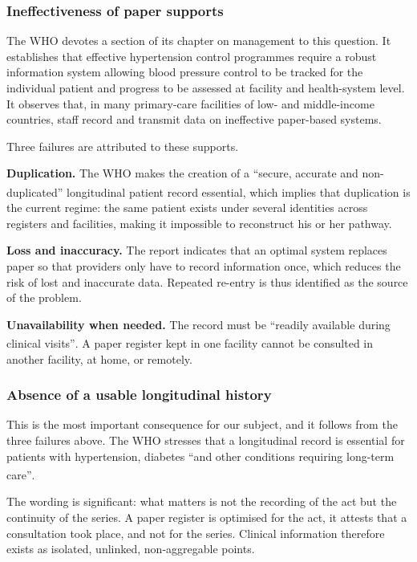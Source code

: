 \documentclass[12pt,a4paper,oneside]{report}
\newcommand{\bq}[1]{``#1''\textsuperscript{\dag}}
\begin{document}
\subsubsection{Ineffectiveness of paper supports}

The WHO devotes a section of its chapter on management to this question. It establishes that effective hypertension control programmes require a robust information system allowing blood pressure control to be tracked for the individual patient and progress to be assessed at facility and health-system level. It observes that, in many primary-care facilities of low- and middle-income countries, staff record and transmit data on ineffective paper-based systems.

Three failures are attributed to these supports.

\textbf{Duplication.} The WHO makes the creation of a \bq{secure, accurate and non-duplicated} longitudinal patient record essential, which implies that duplication is the current regime: the same patient exists under several identities across registers and facilities, making it impossible to reconstruct his or her pathway.

\textbf{Loss and inaccuracy.} The report indicates that an optimal system replaces paper so that providers only have to record information once, which reduces the risk of lost and inaccurate data. Repeated re-entry is thus identified as the source of the problem.

\textbf{Unavailability when needed.} The record must be \bq{readily available during clinical visits}. A paper register kept in one facility cannot be consulted in another facility, at home, or remotely.

\subsubsection{Absence of a usable longitudinal history}

This is the most important consequence for our subject, and it follows from the three failures above. The WHO stresses that a longitudinal record is essential for patients with hypertension, diabetes \bq{and other conditions requiring long-term care}.

The wording is significant: what matters is not the recording of the act but the continuity of the series. A paper register is optimised for the act, it attests that a consultation took place, and not for the series. Clinical information therefore exists as isolated, unlinked, non-aggregable points.
\end{document}
